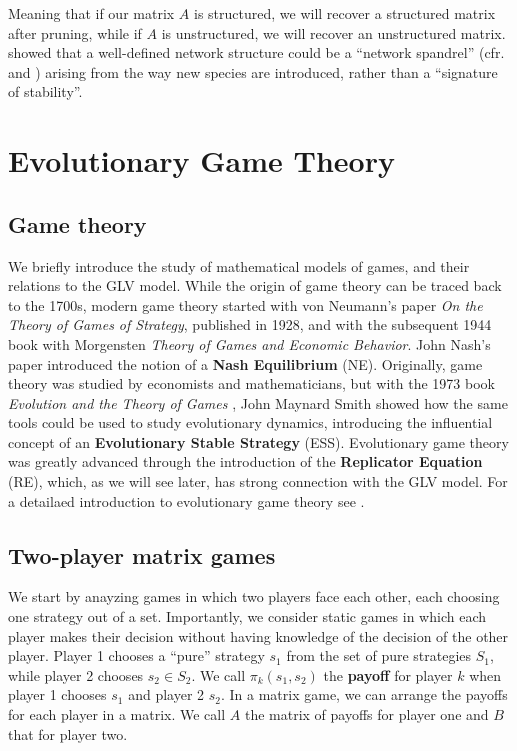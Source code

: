 \documentclass[]{book}
\begin{document}
Meaning that if our matrix \(A\) is structured, we will recover a structured matrix after pruning, while if \(A\) is unstructured, we will recover an unstructured matrix. \citet{maynard2018network} showed that a well-defined network structure could be a ``network spandrel'' (cfr. \citet{gould1979spandrels} and \citet{sole2006network}) arising from the way new species are introduced, rather than a ``signature of stability''.

\hypertarget{games}{%
\chapter{Evolutionary Game Theory}\label{games}}

\hypertarget{game-theory}{%
\section{Game theory}\label{game-theory}}

We briefly introduce the study of mathematical models of games, and their relations to the GLV model. While the origin of game theory can be traced back to the 1700s, modern game theory started with von Neumann's paper \emph{On the Theory of Games of Strategy}, published in 1928, and with the subsequent 1944 book with Morgensten \emph{Theory of Games and Economic Behavior}. John Nash's paper \citep{nash1950equilibrium} introduced the notion of a \textbf{Nash Equilibrium} (NE). Originally, game theory was studied by economists and mathematicians, but with the 1973 book \emph{Evolution and the Theory of Games} \citep{smith1982evolution}, John Maynard Smith showed how the same tools could be used to study evolutionary dynamics, introducing the influential concept of an \textbf{Evolutionary Stable Strategy} (ESS). Evolutionary game theory was greatly advanced through the introduction of the \textbf{Replicator Equation} (RE), which, as we will see later, has strong connection with the GLV model. For a detailaed introduction to evolutionary game theory see \citet{hofbauer1998evolutionary}.

\hypertarget{two-player-matrix-games}{%
\section{Two-player matrix games}\label{two-player-matrix-games}}

We start by anayzing games in which two players face each other, each choosing one strategy out of a set. Importantly, we consider static games in which each player makes their decision without having knowledge of the decision of the other player. Player 1 chooses a ``pure'' strategy \(s_1\) from the set of pure strategies \(S_1\), while player 2 chooses \(s_2 \in S_2\). We call \(\pi_k (s_1, s_2)\) the \textbf{payoff} for player \(k\) when player 1 chooses \(s_1\) and player 2 \(s_2\). In a matrix game, we can arrange the payoffs for each player in a matrix. We call \(A\) the matrix of payoffs for player one and \(B\) that for player two.
\end{document}
